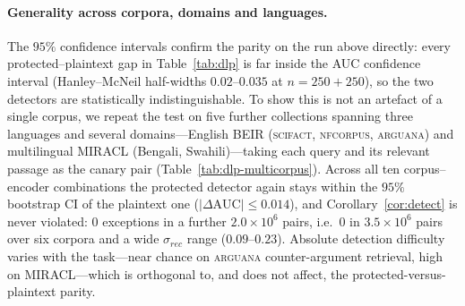 \documentclass[11pt,a4paper]{article}
\begin{document}
\paragraph{Generality across corpora, domains and languages.} The $95\%$
confidence intervals confirm the parity on the run above directly: every
protected--plaintext gap in Table~\ref{tab:dlp} is far inside the AUC
confidence interval (Hanley--McNeil half-widths $0.02$--$0.035$ at
$n=250{+}250$), so the two detectors are statistically indistinguishable.
To show this is not an artefact of a single corpus, we repeat the test on
five further collections spanning three languages and several
domains---English BEIR (\textsc{scifact}, \textsc{nfcorpus},
\textsc{arguana}) and multilingual MIRACL (Bengali, Swahili)---taking each
query and its relevant passage as the canary pair
(Table~\ref{tab:dlp-multicorpus}). Across all ten corpus--encoder
combinations the protected detector again stays within the $95\%$
bootstrap CI of the plaintext one ($|\Delta\mathrm{AUC}|\le0.014$), and
Corollary~\ref{cor:detect} is never violated: $0$ exceptions in a further
$2.0\times10^{6}$ pairs, i.e.\ $0$ in $3.5\times10^{6}$ pairs over six
corpora and a wide $\sigma_{rec}$ range ($0.09$--$0.23$). Absolute
detection difficulty varies with the task---near chance on \textsc{arguana}
counter-argument retrieval, high on MIRACL---which is orthogonal to, and
does not affect, the protected-versus-plaintext parity.
\end{document}
